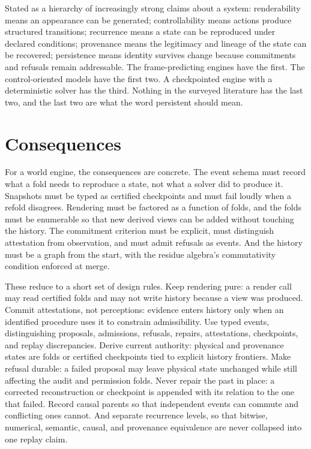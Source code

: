 \documentclass[11pt]{article}
\begin{document}
Stated as a hierarchy of increasingly strong claims about a system: renderability means an appearance can be generated; controllability means actions produce structured transitions; recurrence means a state can be reproduced under declared conditions; provenance means the legitimacy and lineage of the state can be recovered; persistence means identity survives change because commitments and refusals remain addressable. The frame-predicting engines have the first. The control-oriented models have the first two. A checkpointed engine with a deterministic solver has the third. Nothing in the surveyed literature has the last two, and the last two are what the word persistent should mean.

\section{Consequences}

For a world engine, the consequences are concrete. The event schema must record what a fold needs to reproduce a state, not what a solver did to produce it. Snapshots must be typed as certified checkpoints and must fail loudly when a refold disagrees. Rendering must be factored as a function of folds, and the folds must be enumerable so that new derived views can be added without touching the history. The commitment criterion must be explicit, must distinguish attestation from observation, and must admit refusals as events. And the history must be a graph from the start, with the residue algebra's commutativity condition enforced at merge.

These reduce to a short set of design rules. Keep rendering pure: a render call may read certified folds and may not write history because a view was produced. Commit attestations, not perceptions: evidence enters history only when an identified procedure uses it to constrain admissibility. Use typed events, distinguishing proposals, admissions, refusals, repairs, attestations, checkpoints, and replay discrepancies. Derive current authority: physical and provenance states are folds or certified checkpoints tied to explicit history frontiers. Make refusal durable: a failed proposal may leave physical state unchanged while still affecting the audit and permission folds. Never repair the past in place: a corrected reconstruction or checkpoint is appended with its relation to the one that failed. Record causal parents so that independent events can commute and conflicting ones cannot. And separate recurrence levels, so that bitwise, numerical, semantic, causal, and provenance equivalence are never collapsed into one replay claim.
\end{document}
